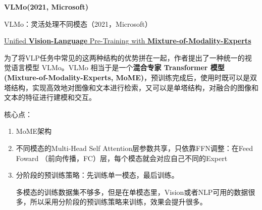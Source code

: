 \documentclass[zihao=false,fontset=windows]{ctexart}
\begin{document}
{\bfseries VLMo(2021, Microsoft)\par}
\vspace{0.15em}

\begin{feishuquote}
VLMo：灵活处理不同模态（2021，Microsoft）\par
\href{https://arxiv.org/abs/2111.02358}{Unified \textbf{Vision-Language} Pre-Training with \textbf{Mixture-of-Modality-Experts}}\par
\end{feishuquote}

\par\vspace{1.15em}\par\vspace{0.28em}
为了将VLP任务中常见的这两种结构的优势拼在一起，作者提出了一种统一的视觉语言模型 VLMo。VLMo 相当于是一个\textbf{混合专家 Transformer 模型 (Mixture-of-Modality-Experts, MoME)}，预训练完成后，使用时既可以是双塔结构，实现高效地对图像和文本进行检索，又可以是单塔结构，对融合的图像和文本的特征进行建模和交互。\par
核心点：\par
\begin{enumerate}
\item MoME架构
\item 不同模态的Multi-Head Self Attention层参数共享，只依靠FFN调整：在Feed Foward （前向传播，FC）层，每个模态就会对应自己不同的Expert
\item 分阶段的预训练策略：先训练单一模态，最后训练。
\begin{feishuquote}
\textcolor{feishuGray2}{多模态的训练数据集不够多，但是在单模态里，Vision或者NLP可用的数据很多，所以采用分阶段的预训练策略来训练，效果会提升很多。}\par
\end{feishuquote}
\end{enumerate}
\end{document}
